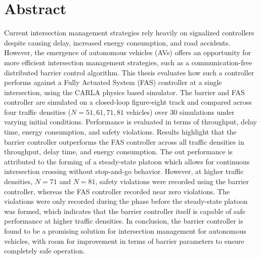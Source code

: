 \section*{Abstract}
Current intersection management strategies rely heavily on signalized controllers despite causing delay, increased energy consumption, and road accidents. However, the emergence of autonomous vehicles (AVs) offers an opportunity for more efficient intersection management strategies, such as a communication-free distributed barrier control algorithm. This thesis evaluates how such a controller performs against a Fully Actuated System (FAS) controller at a single intersection, using the CARLA physics based simulator. The barrier and FAS controller are simulated on a closed-loop figure-eight track and compared across four traffic densities (\(N= 51,61,71,81\) vehicles) over 30 simulations under varying initial conditions. Performance is evaluated in terms of throughput, delay time, energy consumption, and safety violations. Results highlight that the barrier controller outperforms the FAS controller across all traffic densities in throughput, delay time, and energy consumption. The out performance is attributed to the forming of a steady-state platoon which allows for continuous intersection crossing without stop-and-go behavior. However, at higher traffic densities, \(N=71\) and \(N=81\), safety violations were recorded using the barrier controller, whereas the FAS controller recorded near zero violations. The violations were only recorded during the phase before the steady-state platoon was formed, which indicates that the barrier controller itself is capable of safe performance at higher traffic densities. In conclusion, the barrier controller is found to be a promising solution for intersection management for autonomous vehicles, with room  for improvement in terms of barrier parameters to ensure completely safe operation.